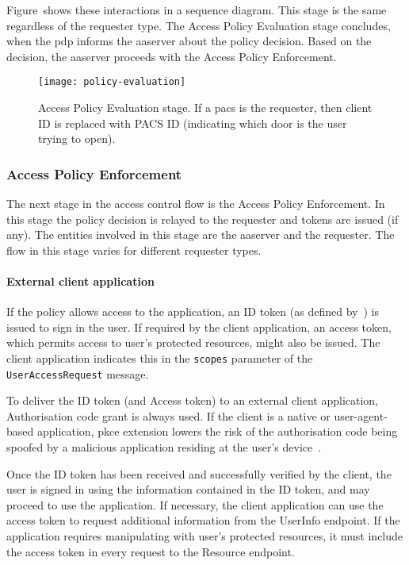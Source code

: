 Figure~shows these interactions in a sequence diagram. This stage is the same regardless of the requester type. The Access Policy Evaluation stage concludes, when the \acrshort{pdp} informs the \acrshort{aaserver} about the policy decision. Based on the decision, the \acrshort{aaserver} proceeds with the Access Policy Enforcement.

\begin{figure}[H]
    \centering
    \texttt{[image: policy-evaluation]}
    \caption{Access Policy Evaluation stage. If a \acrshort{pacs} is the requester, then client ID is replaced with PACS ID (indicating which door is the user trying to open).}
    \label{fig:policy-evaluation}
\end{figure}

\subsubsection{Access Policy Enforcement}
The next stage in the access control flow is the Access Policy Enforcement. In this stage the policy decision is relayed to the requester and tokens are issued (if any). The entities involved in this stage are the \acrshort{aaserver} and the requester. The flow in this stage varies for different requester types.

\paragraph{External client application}
If the policy allows access to the application, an ID token (as defined by~\cite{OpenID2014OpenID1}) is issued to sign in the user. If required by the client application, an access token, which permits access to user's protected resources, might also be issued. The client application indicates this in the \texttt{scopes} parameter of the \texttt{UserAccessRequest} message.

To deliver the ID token (and Access token) to an external client application, Authorisation code grant is always used. If the client is a native or user-agent-based application, \acrshort{pkce} extension lowers the risk of the authorisation code being spoofed by a malicious application residing at the user's device~\cite{Sakimura2015ProofClients}.

Once the ID token has been received and successfully verified by the client, the user is signed in using the information contained in the ID token, and may proceed to use the application. If necessary, the client application can use the access token to request additional information from the UserInfo endpoint. If the application requires manipulating with user's protected resources, it must include the access token in every request to the Resource endpoint.

